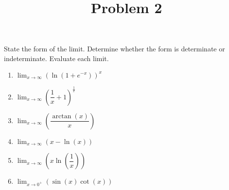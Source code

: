 \documentclass{ximera}
\title[Problem 2]{Problem 2}
\begin{document}
\begin{abstract} \end{abstract}
\maketitle

\begin{problem}

State the form of the limit. Determine whether the form is determinate or indeterminate. Evaluate each limit.  
  \begin{enumerate}
    \item  $\displaystyle \lim_{x \to \infty}\left( \ln (1 + e^{-x}) \right)^x $\\
    \item  $\displaystyle \lim_{x \to \infty} \left( \dfrac{1}{x} + 1 \right)^{\frac{1}{x}} $\\
    \item  $\displaystyle \lim_{x \to \infty} \left( \dfrac{\arctan(x)}{x} \right) $\\
    \item  $\displaystyle \lim_{x \to \infty} (x-\ln(x)) $\\
    \item  $\displaystyle \lim_{x \to \infty} \left( x \ln \left( \dfrac{1}{x} \right) \right) $\\
    \item  $\displaystyle\lim_{x\to0^+} (\sin(x) \cot(x) ) $
    \end{enumerate}
\end{problem}
\end{document}
